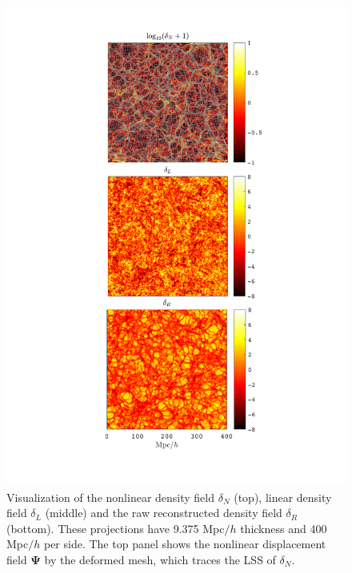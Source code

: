\documentclass[aps,prd,twocolumn,superscriptaddress,amsfont,amssymb,amsmath,nofootinbib,showpacs,balancelastpage]{revtex4-1}
\newcommand{\bs}{\boldsymbol}
\begin{document}

\maketitle
\begin{figure}
 \centering
  \includegraphics[width=0.95\linewidth]{proj.pdf}
  \caption{Visualization of the nonlinear density field $\delta_N$ (top),
  linear density field $\delta_L$ (middle) and the raw reconstructed density
  field $\delta_R$ (bottom). These projections have 9.375 Mpc$/h$ thickness
  and 400 Mpc$/h$ per side. The top panel shows the nonlinear displacement
  field $\bs\Psi$ by the deformed mesh, which traces the LSS of $\delta_N$.}
  \label{fig.projection}
\end{figure}
\end{document}

